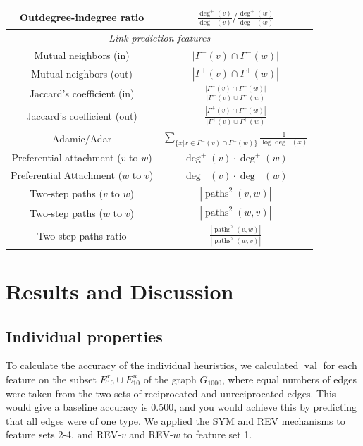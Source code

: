 \documentclass[conference]{IEEEtran}
\begin{document}
\begin{table}[!t]
\begin{tabular}{|c||c|}
\hline
Outdegree-indegree ratio & $\frac{\deg^+(v)}{\deg^-(v)} / \frac{\deg^+(w)}{\deg^-(w)} $ \\
\hline
\multicolumn{2}{|c|}{\emph{Link prediction features}} \\
\hline
Mutual neighbors (in) & $|\Gamma^-(v) \cap \Gamma^-(w)|$ \\
Mutual neighbors (out) & $|\Gamma^+(v) \cap \Gamma^+(w)|$ \\
\hline
Jaccard's coefficient (in) & $\frac{|\Gamma^-(v) \cap \Gamma^-(w)|}{|\Gamma^-(v) \cup \Gamma^-(w)}$ \\
Jaccard's coefficient (out) & $\frac{|\Gamma^+(v) \cap \Gamma^+(w)|}{|\Gamma^+(v) \cup \Gamma^+(w)}$ \\
\hline
Adamic/Adar & $\sum_{\{x|x \in \Gamma^-(v) \cap \Gamma^-(w)\}} \frac{1}{\log{\deg^-(x)}}$ \\
\hline
Preferential attachment ($v$ to $w$) & $\deg^+(v)\cdot \deg^+(w)$ \\
Preferential Attachment ($w$ to $v$) & $\deg^-(v)\cdot \deg^-(w)$ \\
\hline
Two-step paths ($v$ to $w$) & $ |\operatorname{paths}^2(v,w)|$ \\
Two-step paths ($w$ to $v$) & $ |\operatorname{paths}^2(w,v)|$ \\
\hline
Two-step paths ratio & $\frac{|\operatorname{paths}^2(v,w)|}{|\operatorname{paths}^2(w,v)|}$ \\
\hline
\end{tabular}
\end{table}

\section{Results and Discussion}

\subsection{Individual properties}
To calculate the accuracy of the individual heuristics, we calculated $\operatorname{val}$ for each feature on the subset $E_{10}^r \cup E_{10}^u$ of the graph $G_{1000}$, where equal numbers of edges were taken from the two sets of reciprocated and unreciprocated edges. This would give a baseline accuracy is 0.500, and you would achieve this by predicting that all edges were of one type. We applied the SYM and REV mechanisms to feature sets 2-4, and REV-$v$ and REV-$w$ to feature set 1.
\end{document}
